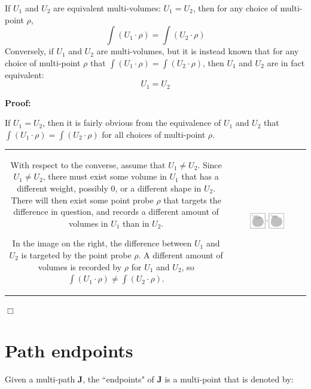 \begin{thm}\label{thm:scanning_volumes}
If \(U_1\) and \(U_2\) are equivalent multi-volumes: \(U_1 = U_2\), then for any choice of multi-point \(\rho\), 
\[\int (U_1 \cdot \rho) = \int (U_2 \cdot \rho)\]
Conversely, if \(U_1\) and \(U_2\) are multi-volumes, but it is instead known that for any choice of multi-point \(\rho\) that 
\(\int (U_1 \cdot \rho) = \int (U_2 \cdot \rho)\), then \(U_1\) and \(U_2\) are in fact equivalent:
\[U_1 = U_2\]  
\end{thm}
\textbf{Proof:}

If \(U_1 = U_2\), then it is fairly obvious from the equivalence of \(U_1\) and \(U_2\) that \(\int (U_1 \cdot \rho) = \int (U_2 \cdot \rho)\) for all choices of multi-point \(\rho\). 

\vspace{5mm}

\begin{tabular}{cc}
\parbox{0.5\textwidth}{
With respect to the converse, assume that \(U_1 \neq U_2\). Since \(U_1 \neq U_2\), there must exist some volume in \(U_1\) that has a different weight, possibly \(0\), or a different shape in \(U_2\). There will then exist some point probe \(\rho\) that targets the difference in question, and records a different amount of volumes in \(U_1\) than in \(U_2\).

In the image on the right, the difference between \(U_1\) and \(U_2\) is targeted by the point probe \(\rho\). A different amount of volumes is recorded by \(\rho\) for \(U_1\) and \(U_2\), so \(\int (U_1 \cdot \rho) \neq \int (U_2 \cdot \rho)\).
} & \parbox{0.5\textwidth}{
\includegraphics[width = 0.5\textwidth]{Point_totals/scanning_volumes_using_points}
}
\end{tabular}

\(\Box\)





\section{Path endpoints}

Given a multi-path \(\mathbf{J}\), the ``endpoints" of \(\mathbf{J}\) is a multi-point that is denoted by:

